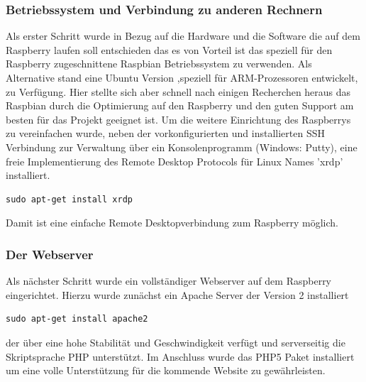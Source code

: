 \documentclass[11pt,a4paper]{article} %
\begin{document}
\subsubsection{Betriebssystem und Verbindung zu anderen Rechnern}
Als erster Schritt wurde in Bezug auf die Hardware und die Software die auf dem Raspberry laufen soll entschieden das es von Vorteil ist das speziell f\"ur den Raspberry zugeschnittene Raspbian Betriebssystem zu verwenden. Als Alternative stand eine Ubuntu Version ,speziell f\"ur ARM-Prozessoren entwickelt, zu Verf\"ugung. Hier stellte sich aber schnell nach einigen Recherchen heraus das Raspbian durch die Optimierung auf den Raspberry und den guten Support am besten f\"ur das Projekt geeignet ist. Um die weitere Einrichtung des Raspberrys zu vereinfachen wurde, neben der vorkonfigurierten und installierten SSH Verbindung zur Verwaltung \"uber ein Konsolenprogramm (Windows: Putty), eine freie Implementierung des Remote Desktop Protocols f\"ur Linux Names 'xrdp' installiert.
\begin{frame}

\begin{lstlisting}
sudo apt-get install xrdp
\end{lstlisting}

\end{frame}
Damit ist eine einfache Remote Desktopverbindung zum Raspberry m\"oglich.
\par
\subsubsection{Der Webserver}
Als n\"achster Schritt wurde ein vollst\"andiger Webserver auf dem Raspberry eingerichtet. Hierzu wurde zun\"achst ein Apache Server der Version 2 installiert
\begin{frame}

\begin{lstlisting}
sudo apt-get install apache2
\end{lstlisting}

\end{frame}
 der \"uber eine hohe Stabilit\"at und Geschwindigkeit verf\"ugt und serverseitig die Skriptsprache PHP unterst\"utzt. Im Anschluss wurde das PHP5 Paket installiert um eine volle Unterst\"utzung f\"ur die kommende Website zu gew\"ahrleisten.
\par
\end{document}
